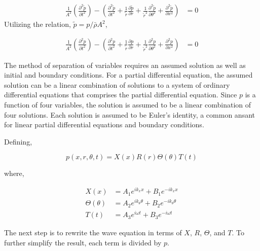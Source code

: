 \begin{align*} 
    \frac{1}{A^2}\left(
        \frac{\partial^2 \tilde{p}}{\partial t^2}
    \right) - 
        \left(
            \frac{\partial^2 \tilde{p}}{\partial t^2} + 
            \frac{1}{\tilde{r}}\frac{\partial \tilde{p}}{\partial  r}  +
            \frac{1}{\tilde{r}^2} \frac{\partial^2 \tilde{p}}{\partial \theta^2} + 
            \frac{\partial^2 \tilde{p}}{\partial x^2} 
        \right) &= 0  
\end{align*} 
Utilizing the relation, $\tilde{p} = p/\bar{\rho} A^2$,

\begin{align*} 
    \frac{1}{A^2}\left(
        \frac{\partial^2 {p}}{\partial t^2}
    \right) - 
        \left(
            \frac{\partial^2 {p}}{\partial t^2} + 
            \frac{1}{\tilde{r}}\frac{\partial p}{\partial r} +
            \frac{1}{\tilde{r}^2} \frac{\partial^2 p}{\partial \theta^2} + 
            \frac{\partial^2 p}{\partial x^2} 
        \right) &= 0  
\end{align*} 

 The method of separation of variables requires an assumed solution as well as initial and boundary 
conditions. For a partial differential equation, the assumed solution can be a 
linear combination of solutions to a system of ordinary differential equations that
comprises the partial differential equation. Since $p$ is a function of four
variables, the solution is assumed to be a linear combination of four solutions.
Each solution is assumed to be Euler's identity, a common ansant for linear partial 
differential equations and boundary conditions.

 Defining,

\begin{equation}
    p(x,r,\theta,t) = X(x) R(r) \Theta(\theta) T(t)
\end{equation}

where, 

\begin{align*}
    X(x) &=
    A_1 e^{ik_x x} +
    B_1 e^{-ik_x x }\\
    \Theta(\theta) &=
    A_2 e^{i k_{\theta} \theta } +
    B_2 e^{-ik_{\theta} \theta }\\
    T(t) &=
    A_3 e^{i \omega t } +
    B_3 e^{-i\omega t  }
\end{align*}

The next step is to rewrite the wave equation in terms of $X$, $R$, $\Theta$,
and $T$. To further simplify the result, each term is divided by $p$.


